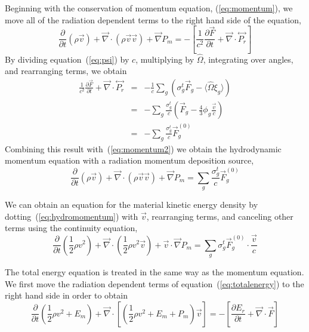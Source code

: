 \documentclass{article}
\newcommand{\partl}[2]{\ensuremath{\frac{\partial{#1}}{\partial{#2}}}}\newcommand{\del}{\ensuremath{\vec{\nabla}}}
\newcommand{\tensor}[1]{\ensuremath{\stackrel{\leftrightarrow}{#1}}}
\begin{document}
Beginning with the conservation of momentum equation, (\ref{eq:momentum}),
we move all of the radiation dependent terms to the right hand side of the
equation,
\begin{equation}
   \partl{}{t}\left( \rho \vec{v}\right)
      + \del \cdot \left( \rho \vec{v} \vec{v} \right)
      + \del P_{m}
   =
   - \left[ \frac{1}{c^2} \partl{\vec{F}}{t}
            + \del \cdot \tensor{P_{r}}
     \right]
\label{eq:momentum2}
\end{equation}
By dividing equation~(\ref{eq:psi}) by $c$, multiplying by $\hat{\Omega}$,
integrating over angles, and rearranging terms, we obtain
\begin{eqnarray}
   \frac{1}{c^2} \partl{\vec{F}}{t} + \del \cdot \tensor{P_{r}}
      &=& - \frac{1}{c} \sum_{g} \left( \sigma^{t}_{g} \vec{F}_{g}
                              - \langle \hat{\Omega} \xi_{g} \rangle \right)
         \\
      &=& - \sum_{g} \frac{\sigma^{t}_{g}}{c}
             \left( \vec{F}_{g} - \frac{4}{3} \phi_{g} \frac{\vec{v}}{c} \right)
         \\
      &=& - \sum_{g} \frac{\sigma^{t}_{g}}{c} \vec{F}^{(0)}_{g}
\end{eqnarray}
Combining this result with~(\ref{eq:momentum2}) we obtain the hydrodynamic
momentum equation with a radiation momentum deposition source,
\begin{equation}
 \boxed{
   \partl{}{t}\left( \rho \vec{v}\right)
      + \del \cdot \left( \rho \vec{v} \vec{v} \right)
      + \del P_{m}
   =
    \sum_{g} \frac{\sigma^{t}_{g}}{c} \vec{F}^{(0)}_{g}
 }
\label{eq:hydromomentum}
\end{equation}

We can obtain an equation for the material kinetic energy density by
dotting~(\ref{eq:hydromomentum}) with $\vec{v}$, rearranging terms, and
canceling other terms using the continuity equation,
\begin{equation}
     \partl{}{t} \left(\frac{1}{2} \rho v^2\right)
   + \del \cdot \left(\frac{1}{2} \rho v^2 \vec{v} \right)
   + \vec{v} \cdot \del P_{m}
   = \sum_{g} \sigma^{t}_{g} \vec{F}^{(0)}_{g} \cdot \frac{\vec{v}}{c}
\label{eq:hydrokinetic}
\end{equation}

The total energy equation is treated in the same way as the
momentum equation.
We first move the radiation dependent terms of equation~(\ref{eq:totalenergy})
to the right hand side in order to obtain
\begin{equation}
        \partl{}{t}\left( \frac{1}{2} \rho v^2
                          + E_{m}\right)
         + \del \cdot \left[
              \left( \frac{1}{2} \rho v^2 + E_{m} + P_{m} \right) \vec{v}
                      \right]
    =
        - \left[ \partl{E_{r}}{t} + \del \cdot \vec{F} \right]
\label{eq:totalenergy2}
\end{equation}
\end{document}
